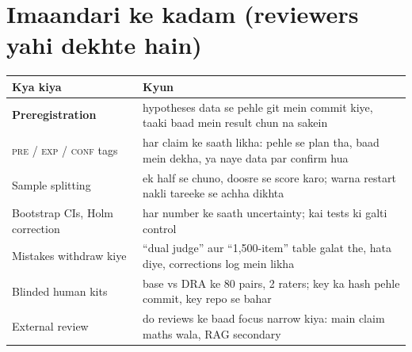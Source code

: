 \documentclass[10pt,a4paper]{article}
\begin{document}
\section{Imaandari ke kadam (reviewers yahi dekhte hain)}
\begin{center}\small
\begin{tabularx}{\textwidth}{lX}
\toprule
Kya kiya & Kyun \\
\midrule
\textbf{Preregistration} & hypotheses data se pehle git mein commit kiye, taaki baad mein result chun na sakein \\
\textsc{pre} / \textsc{exp} / \textsc{conf} tags & har claim ke saath likha: pehle se plan tha, baad mein dekha, ya naye data par confirm hua \\
Sample splitting & ek half se chuno, doosre se score karo; warna restart nakli tareeke se achha dikhta \\
Bootstrap CIs, Holm correction & har number ke saath uncertainty; kai tests ki galti control \\
Mistakes withdraw kiye & ``dual judge'' aur ``1,500-item'' table galat the, hata diye, corrections log mein likha \\
Blinded human kits & base vs DRA ke 80 pairs, 2 raters; key ka hash pehle commit, key repo se bahar \\
External review & do reviews ke baad focus narrow kiya: main claim maths wala, RAG secondary \\
\bottomrule
\end{tabularx}
\end{center}
\end{document}
